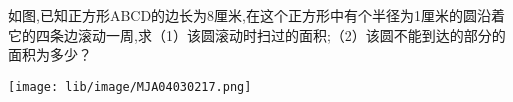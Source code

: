 如图,已知正方形ABCD的边长为8厘米,在这个正方形中有个半径为1厘米的圆沿着它的四条边滚动一周,求（1）该圆滚动时扫过的面积;（2）该圆不能到达的部分的面积为多少？

\begin{flushright}

    \texttt{[image: lib/image/MJA04030217.png]}

\end{flushright}



